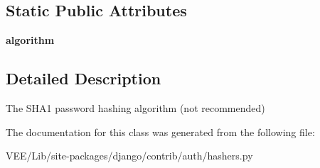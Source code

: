 \subsection*{Static Public Attributes}
\begin{DoxyCompactItemize}
\item 
\mbox{\label{classdjango_1_1contrib_1_1auth_1_1hashers_1_1_s_h_a1_password_hasher_aff22d8466007a4547c1e578440f9cb12}} 
{\bfseries algorithm}
\end{DoxyCompactItemize}


\subsection{Detailed Description}
\begin{DoxyVerb}The SHA1 password hashing algorithm (not recommended)
\end{DoxyVerb}
 

The documentation for this class was generated from the following file\+:\begin{DoxyCompactItemize}
\item 
V\+E\+E/\+Lib/site-\/packages/django/contrib/auth/hashers.\+py\end{DoxyCompactItemize}
